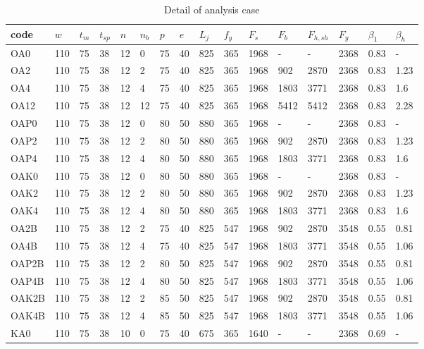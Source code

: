 \begin{table}[htbp]
\centering
\caption{Detail of analysis case}
\begin{tabular}{@{}llllllllllllllll@{}}
\toprule
code & $w$ & $t_m$ & $t_{sp}$ & $n$ & $n_b$ & $p$ & $e$ & $L_j$ & $f_y$ & $F_s$ & $F_b$ & $F_{h,sh}$ & $F_y$ & $\beta_1$ & $\beta_h$ \\ \midrule
OA0 & 110 & 75 & 38 & 12 & 0 & 75 & 40 & 825 & 365 & 1968 & - & - & 2368 & 0.83 & - \\
OA2 & 110 & 75 & 38 & 12 & 2 & 75 & 40 & 825 & 365 & 1968 & 902 & 2870 & 2368 & 0.83 & 1.23 \\
OA4 & 110 & 75 & 38 & 12 & 4 & 75 & 40 & 825 & 365 & 1968 & 1803 & 3771 & 2368 & 0.83 & 1.6 \\
OA12 & 110 & 75 & 38 & 12 & 12 & 75 & 40 & 825 & 365 & 1968 & 5412 & 5412 & 2368 & 0.83 & 2.28 \\
OAP0 & 110 & 75 & 38 & 12 & 0 & 80 & 50 & 880 & 365 & 1968 & - & - & 2368 & 0.83 & - \\
OAP2 & 110 & 75 & 38 & 12 & 2 & 80 & 50 & 880 & 365 & 1968 & 902 & 2870 & 2368 & 0.83 & 1.23 \\
OAP4 & 110 & 75 & 38 & 12 & 4 & 80 & 50 & 880 & 365 & 1968 & 1803 & 3771 & 2368 & 0.83 & 1.6 \\
OAK0 & 110 & 75 & 38 & 12 & 0 & 80 & 50 & 880 & 365 & 1968 & - & - & 2368 & 0.83 & - \\
OAK2 & 110 & 75 & 38 & 12 & 2 & 80 & 50 & 880 & 365 & 1968 & 902 & 2870 & 2368 & 0.83 & 1.23 \\
OAK4 & 110 & 75 & 38 & 12 & 4 & 80 & 50 & 880 & 365 & 1968 & 1803 & 3771 & 2368 & 0.83 & 1.6 \\
OA2B & 110 & 75 & 38 & 12 & 2 & 75 & 40 & 825 & 547 & 1968 & 902 & 2870 & 3548 & 0.55 & 0.81 \\
OA4B & 110 & 75 & 38 & 12 & 4 & 75 & 40 & 825 & 547 & 1968 & 1803 & 3771 & 3548 & 0.55 & 1.06 \\
OAP2B & 110 & 75 & 38 & 12 & 2 & 80 & 50 & 825 & 547 & 1968 & 902 & 2870 & 3548 & 0.55 & 0.81 \\
OAP4B & 110 & 75 & 38 & 12 & 4 & 80 & 50 & 825 & 547 & 1968 & 1803 & 3771 & 3548 & 0.55 & 1.06 \\
OAK2B & 110 & 75 & 38 & 12 & 2 & 85 & 50 & 825 & 547 & 1968 & 902 & 2870 & 3548 & 0.55 & 0.81 \\
OAK4B & 110 & 75 & 38 & 12 & 4 & 85 & 50 & 825 & 547 & 1968 & 1803 & 3771 & 3548 & 0.55 & 1.06 \\
KA0 & 110 & 75 & 38 & 10 & 0 & 75 & 40 & 675 & 365 & 1640 & - & - & 2368 & 0.69 & - \\

\end{tabular}
\end{table}
